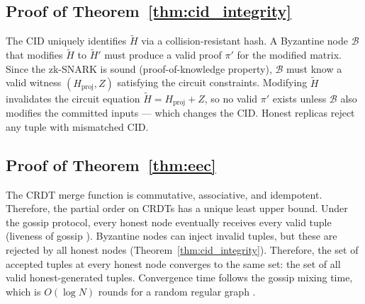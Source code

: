 \documentclass[conference]{IEEEtran}
\begin{document}
\subsection{Proof of Theorem~\ref{thm:cid_integrity}}
The CID uniquely identifies $\tilde{H}$ via a collision-resistant hash.  A Byzantine
node $\mathcal{B}$ that modifies $\tilde{H}$ to $\tilde{H}'$ must produce a valid proof
$\pi'$ for the modified matrix.  Since the zk-SNARK is sound (proof-of-knowledge
property), $\mathcal{B}$ must know a valid witness $(H_{\mathrm{proj}}, Z)$ satisfying
the circuit constraints.  Modifying $\tilde{H}$ invalidates the circuit equation
$\tilde{H} = H_{\mathrm{proj}} + Z$, so no valid $\pi'$ exists unless $\mathcal{B}$
also modifies the committed inputs — which changes the CID.  Honest replicas reject
any tuple with mismatched CID.

\subsection{Proof of Theorem~\ref{thm:eec}}
The CRDT merge function is commutative, associative, and idempotent.  Therefore, the
partial order on CRDTs has a unique least upper bound.  Under the gossip protocol, every
honest node eventually receives every valid tuple (liveness of gossip
\cite{eugster2004epidemic}).  Byzantine nodes can inject invalid tuples, but these are
rejected by all honest nodes (Theorem~\ref{thm:cid_integrity}).  Therefore, the set of
accepted tuples at every honest node converges to the same set: the set of all valid
honest-generated tuples.  Convergence time follows the gossip mixing time, which is
$O(\log N)$ rounds for a random regular graph \cite{levin2009markov}.
\end{document}
